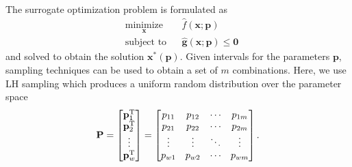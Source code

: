 The surrogate optimization problem is formulated as
\begin{equation}
	\begin{aligned}
		& \underset{\mathbf{x}}{\text{minimize}}
		& & \hat{f}(\mathbf{x};{\mathbf{p}})\\
		& \text{subject to}
		& & \hat{\mathbf{g}}(\mathbf{x};{\mathbf{p}}) \le \mathbf{0}
	\end{aligned}
	\label{eq:SBDoptproblem}
\end{equation}
and solved to obtain the solution $\mathbf{x}^*({\mathbf{p}})$. Given intervals for the parameters $\mathbf{p}$, sampling techniques can be used to obtain a set of $m$ combinations. Here, we use \ac{LH} sampling which produces a uniform random distribution over the parameter space \cite{McKay1979}
\begin{equation}
	 {\mathbf{P}} = \begin{bmatrix}
	 	\mathbf{p}_{1}^{\text T} \\ 
	 	\mathbf{p}_{2}^{\text T} \\ 
	 	\vdots \\ 
	 	\mathbf{p}_{w}^{\text T}
	\end{bmatrix} = \begin{bmatrix}
	 	p_{11} & p_{12} & \cdots & p_{1m}\\ 
	 	p_{21} & p_{22} & \cdots & p_{2m}\\ 
	 	\vdots & \vdots & \ddots & \vdots\\ 
	 	p_{w1} & p_{w2} & \cdots & p_{wm}
	\end{bmatrix}.
\end{equation}

